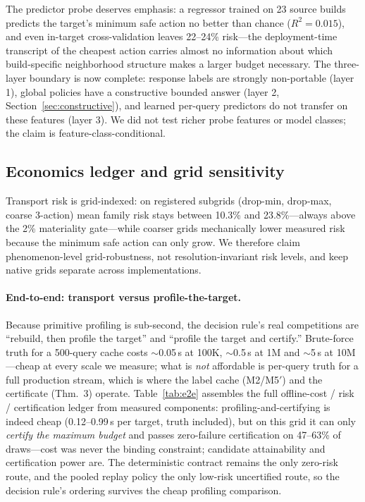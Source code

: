 \documentclass{article}
\begin{document}
The predictor probe deserves emphasis: a regressor trained on 23 source builds predicts the target's
minimum safe action no better than chance ($R^2=0.015$), and even in-target cross-validation leaves
22--24\% risk---the deployment-time transcript of the cheapest action carries almost no information about
which build-specific neighborhood structure makes a larger budget necessary. The three-layer boundary is
now complete: response labels are strongly non-portable (layer 1), global policies have a constructive
bounded answer (layer 2, Section~\ref{sec:constructive}), and learned per-query predictors do not transfer
on these features (layer 3). We did not test richer probe features or model classes; the claim is
feature-class-conditional.

\subsection{Economics ledger and grid sensitivity}

Transport risk is grid-indexed: on registered subgrids (drop-min, drop-max, coarse 3-action) mean family
risk stays between 10.3\% and 23.8\%---always above the 2\% materiality gate---while coarser grids
mechanically lower measured risk because the minimum safe action can only grow. We therefore claim
phenomenon-level grid-robustness, not resolution-invariant risk levels, and keep native grids separate
across implementations.

\paragraph{End-to-end: transport versus profile-the-target.}
Because primitive profiling is sub-second, the decision rule's real competitions are ``rebuild, then
profile the target'' and ``profile the target and certify.'' Brute-force truth for a 500-query cache
costs $\sim$0.05\,s at 100K, $\sim$0.5\,s at 1M and $\sim$5\,s at 10M---cheap at every scale we
measure; what is \emph{not} affordable is per-query truth for a full production stream, which is where
the label cache (M2/M5$'$) and the certificate (Thm.~3) operate. Table~\ref{tab:e2e} assembles the full offline-cost / risk / certification
ledger from measured components: profiling-and-certifying is indeed cheap (0.12--0.99\,s per target,
truth included), but on this grid it can only \emph{certify the maximum budget} and passes zero-failure
certification on 47--63\% of draws---cost was never the binding constraint; candidate attainability and
certification power are. The deterministic contract remains the only zero-risk route, and the pooled
replay policy the only low-risk uncertified route, so the decision rule's ordering survives the cheap
profiling comparison.
\end{document}
